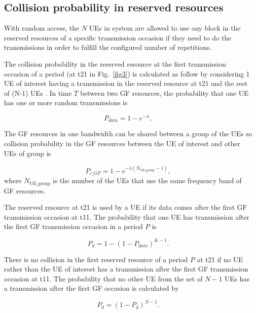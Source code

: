 \documentclass[conference]{IEEEtran}
\begin{document}
\subsection{Collision probability in reserved resources}\label{IICC}
With random access, the $N$ UEs in system are allowed to use any block in the reserved resources of a specific transmission occasion if they need to do the transmissions in order to fulfill the configured number of repetitions.

The collision probability in the reserved resource at the first transmission occasion of a period (at t21 in Fig.~\ref{fig3}) is calculated as follow by considering 1 UE of interest having a transmission in the reserved resource at t21 and the rest of (N-1) UEs . 
In time $T$ between two GF resources, the probability that one UE has one or more random transmissions is \useshortskip

\begin{equation}
P_{data} = 1 - e^{-\lambda},\label{eq1}
\end{equation}

The GF resources in one bandwidth can be shared between a group of the UEs so collision probability in the GF resources between the UE of interest and other UEs of group is \useshortskip

\begin{equation}
P_{c\_GF} = 1 - e^{-\lambda(N_\mathrm{UE\_group}-1)},\label{eq2}
\end{equation}
where $N_\mathrm{UE\_group}$ is the number of the UEs that use the same frequency band of GF resources.

The reserved resource at t21 is used by a UE if its data comes after the first GF transmission occasion at t11. The probability that one UE has transmission after the first GF transmission occasion in a period $P$ is \useshortskip

\begin{equation}
P_{d} = 1 - (1-P_{data})^{K-1}.\label{eq3}
\end{equation}

There is no collision in the first reserved resource of a period $P$ at t21 if no UE rather than the UE of interest has a transmission after the first GF transmission occasion at t11. The probability that no other UE from the set of $N-1$ UEs has a transmission after the first GF occasion is calculated by \useshortskip

\begin{equation}
P_{0} = (1-P_{d})^{N-1}.\label{eq4}
\end{equation}
\end{document}
